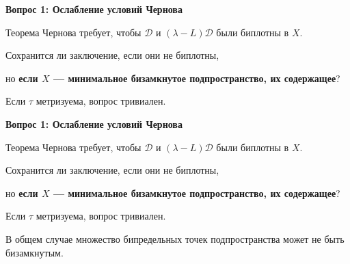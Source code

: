 \documentclass[11pt]{article}
\begin{document}
\begin{center}
{\color{notaeYELLOW}\bfseries\fontsize{44}{52}\selectfont Вопрос 1: Ослабление условий Чернова}
\end{center}
\vspace*{\fill}
\begin{center}
\fontsize{36}{43}\selectfont
\parbox{\linewidth}{\centering\noindent Теорема Чернова требует, чтобы $\mathcal{D}$ и $(\lambda-L)\mathcal{D}$ были биплотны в $X$.
\par}\vspace{0.4in}
\parbox{\linewidth}{\centering\noindent Сохранится ли заключение, если они не биплотны,
\par}\vspace{0.4in}
\parbox{\linewidth}{\centering\noindent но \textbf{если $X$ --- минимальное бизамкнутое подпространство, их содержащее}?
\par}\vspace{0.4in}
\parbox{\linewidth}{\centering\noindent Если $\tau$ метризуема, вопрос тривиален.
\par}\vspace{0.4in}
\end{center}
\vspace*{\fill}

\newpage

\begin{center}
{\color{notaeYELLOW}\bfseries\fontsize{44}{52}\selectfont Вопрос 1: Ослабление условий Чернова}
\end{center}
\vspace*{\fill}
\begin{center}
\fontsize{36}{43}\selectfont
\parbox{\linewidth}{\centering\noindent Теорема Чернова требует, чтобы $\mathcal{D}$ и $(\lambda-L)\mathcal{D}$ были биплотны в $X$.
\par}\vspace{0.4in}
\parbox{\linewidth}{\centering\noindent Сохранится ли заключение, если они не биплотны,
\par}\vspace{0.4in}
\parbox{\linewidth}{\centering\noindent но \textbf{если $X$ --- минимальное бизамкнутое подпространство, их содержащее}?
\par}\vspace{0.4in}
\parbox{\linewidth}{\centering\noindent Если $\tau$ метризуема, вопрос тривиален.
\par}\vspace{0.4in}
\parbox{\linewidth}{\centering\noindent В общем случае множество бипредельных точек подпространства может не быть бизамкнутым.
\par}\vspace{0.4in}
\end{center}
\vspace*{\fill}
\end{document}

